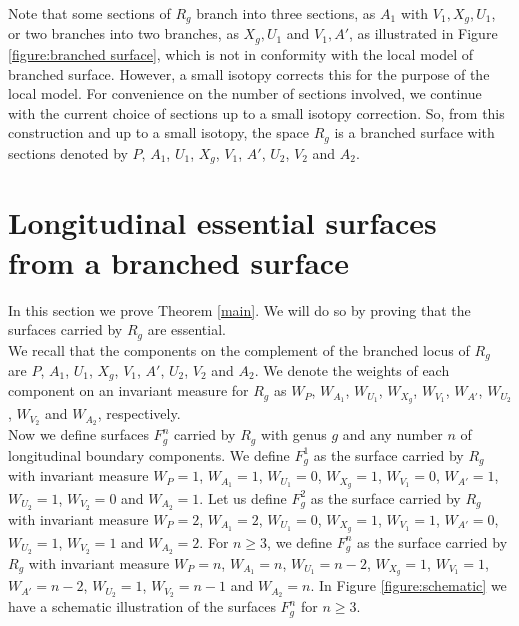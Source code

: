 \documentclass[reqno]{amsart}
\theoremstyle{definition}
\theoremstyle{remark}
\begin{document}
Note that some sections of $R_g$ branch into three sections,  as $A_1$ with $V_1,  X_g,   U_1$,  or two branches into two branches,  as $X_g,  U_1$ and $V_1,  A'$,  as illustrated in Figure \ref{figure:branched surface},  which is not in conformity with the local model of branched surface.  However,  a small isotopy corrects this for the purpose of the local model. For convenience on the number of sections involved, we continue with the current choice of sections up to a small isotopy correction. So, from this construction and up to a small isotopy, the space $R_g$ is a branched surface with sections denoted by $P$, $A_1$, $U_1$, $X_g$,  $V_1$,  $A'$, $U_2$, $V_2$ and $A_2$.



\section{Longitudinal essential surfaces from a branched surface}\label{section: surfaces}

In this section we prove Theorem \ref{main}.  We will do so by proving that the surfaces carried by $R_g$ are essential. \\

We recall that the components on the complement of the branched locus of $R_g$ are $P$, $A_1$,  $U_1$, $X_g$, $V_1$,  $A'$, $U_2$, $V_2$ and $A_2$.  We denote the weights of each component on an invariant measure for $R_g$ as $W_P$,  $W_{A_1}$, $W_{U_1}$,  $W_{X_g}$,  $W_{V_1}$,  $W_{A'}$,  $W_{U_2}$,  $W_{V_2}$ and $W_{A_2}$, respectively.\\

Now we define surfaces $F_g^n$ carried by $R_g$ with genus $g$ and any number $n$ of longitudinal boundary components.  We define $F_g^1$ as the surface carried by $R_g$ with invariant measure $W_P=1$, $W_{A_1}=1$,  $W_{U_1}=0$, $W_{X_g}=1$,  $W_{V_1}=0$, $W_{A'}=1$, $W_{U_2}=1$, $W_{V_2}=0$ and $W_{A_2}=1$.  Let us define $F_g^2$ as the surface carried by $R_g$ with invariant measure $W_P=2$, $W_{A_1}=2$, $W_{U_1}=0$, $W_{X_g}=1$,  $W_{V_1}=1$, $W_{A'}=0$, $W_{U_2}=1$, $W_{V_2}=1$ and $W_{A_2}=2$.  For $n\geq 3$, we define $F_g^n$ as the surface carried by $R_g$ with invariant measure $W_P=n$, $W_{A_1}=n$, $W_{U_1}=n-2$, $W_{X_g}=1$,  $W_{V_1}=1$, $W_{A'}=n-2$, $W_{U_2}=1$, $W_{V_2}=n-1$ and $W_{A_2}=n$.  In Figure \ref{figure:schematic} we have a schematic illustration of the surfaces $F_g^n$ for $n\geq 3$.\\
\end{document}
